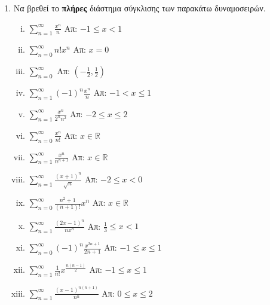




\everymath{\displaystyle}
\pagestyle{askhseis}




\begin{center}
  \minibox{\large\bfseries \textcolor{Col1}{Ασκήσεις στις Δυναμοσειρές}}
\end{center}

\vspace{\baselineskip}

\begin{enumerate}
  \item Να βρεθεί το \textbf{πλήρες} διάστημα σύγκλισης των παρακάτω δυναμοσειρών.
    \begin{enumerate}[i)]
      \item $\sum_{n=1}^{\infty} \frac{x^{n}}{n}$ \hfill Απ: $-1\leq x <1$
      \item $\sum_{n=0}^{\infty} n!x^{n}$ \hfill Απ: $x=0$
      \item $\sum_{n=0}^{\infty}$ \hfill  Απ: $(-\frac{1}{2},\frac{1}{2})$
      \item $\sum_{n=1}^{\infty} (-1)^{n}\frac{x^{n}}{n}$ \hfill Απ: $-1<x\leq 1$
      \item $\sum_{n=1}^{\infty} \frac{x^{n}}{2^{n}n^{2}}$ \hfill Απ: $-2\leq x \leq 2$
      \item $\sum_{n=0}^{\infty} \frac{x^{n}}{n!}$ \hfill Απ: $x\in \mathbb{R}$
      \item $\sum_{n=1}^{\infty} \frac{x^{n}}{n^{n+1}}$ \hfill Απ: $x\in \mathbb{R}$
      \item $\sum_{n=1}^{\infty} \frac{(x+1)^{n}}{\sqrt{n}}$ \hfill Απ: $-2\leq x <0$
      \item $\sum_{n=0}^{\infty} \frac{n^{2}+1}{(n+1)!}x^{n}$ \hfill Απ: $x\in\mathbb{R}$
      \item $\sum_{n=1}^{\infty} \frac{(2x-1)^{n}}{nx^{n}}$ 
        \hfill Απ: $\frac{1}{3}\leq x<1$
      \item $\sum_{n=0}^{\infty} (-1)^{n}\frac{x^{2n+1}}{2n+1}$ 
        \hfill Απ: $-1\leq x\leq 1$
      \item $\sum_{n=1}^{\infty} \frac{1}{n!} x^{\frac{n(n-1)}{2}}$ 
        \hfill Απ: $-1\leq x\leq 1$
      \item $\sum_{n=1}^{\infty} \frac{(x-1)^{n(n+1)}}{n^{n}}$ 
        \hfill Απ: $0\leq x \leq 2$
    \end{enumerate}
\end{enumerate}


